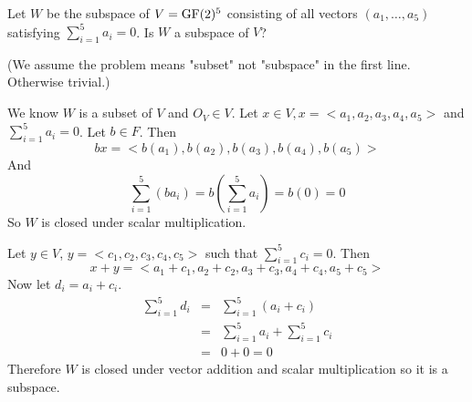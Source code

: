 \begin{problem}[Golan 81]

Let $W$ be the subspace of $V = \operatorname{GF}(2)^5$ consisting of all vectors 
$(a_1, \dots, a_5)$ satisfying $\sum_{i=1}^5 a_i = 0$.  Is $W$ a subspace of $V$?

\end{problem}
\smallskip
\begin{solution}
(We assume the problem means "subset" not "subspace" in the first line.  Otherwise trivial.)

We know $W$ is a subset of $V$ and $O_V \in V$. Let $x \in V, x = <a_1,a_2,a_3,a_4,a_5>$ and $\sum_{i=1}^{5}a_i = 0$. Let $b \in F$. Then 
$$bx = <b(a_1),b(a_2),b(a_3),b(a_4),b(a_5)>$$
And
$$\sum_{i=1}^{5}(ba_i) = b\left(\sum_{i=1}^{5}a_i\right) = b(0) = 0$$
So $W$ is closed under scalar multiplication.

Let $y \in V$, $y = <c_1,c_2,c_3,c_4,c_5>$ such that $\sum_{i=1}^{5}c_i = 0$.  Then
$$x+y = <a_1+c_1,a_2+c_2,a_3+c_3,a_4+c_4,a_5+c_5>$$
Now let $d_i = a_i + c_i$.
\begin{eqnarray*}
\sum_{i=1}^{5}d_i & = & \sum_{i=1}^{5}(a_i + c_i) \\
				  & = & \sum_{i=1}^{5}a_i + \sum_{i=1}^{5}c_i \\
				  & = & 0 + 0 = 0
\end{eqnarray*}
Therefore $W$ is closed under vector addition and scalar multiplication so it is a subspace.
\end{solution}
\probskip


